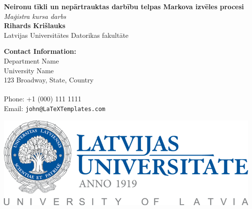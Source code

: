 \documentclass[a0,landscape]{a0poster}
\begin{document}


\begin{minipage}[b]{0.55\linewidth}
\veryHuge \color{NavyBlue} \textbf{Neironu tīkli un nepārtrauktas darbību telpas Markova izvēles procesi} \color{Black}\\ %
\Huge\textit{Maģistra kursa darbs}\\[1cm] %
\huge \textbf{Rihards Krišlauks}\\ %
\huge Latvijas Universitātes Datorikas fakultāte\\ %
\end{minipage}
%
\begin{minipage}[b]{0.25\linewidth}
\color{DarkSlateGray}\Large \textbf{Contact Information:}\\
Department Name\\ %
University Name\\
123 Broadway, State, Country\\\\
Phone: +1 (000) 111 1111\\ %
Email: \texttt{john@LaTeXTemplates.com}\\ %
\end{minipage}
%
\begin{minipage}[b]{0.19\linewidth}
\includegraphics[width=20cm]{lu-logo-full.png} %
\end{minipage}
\end{document}
